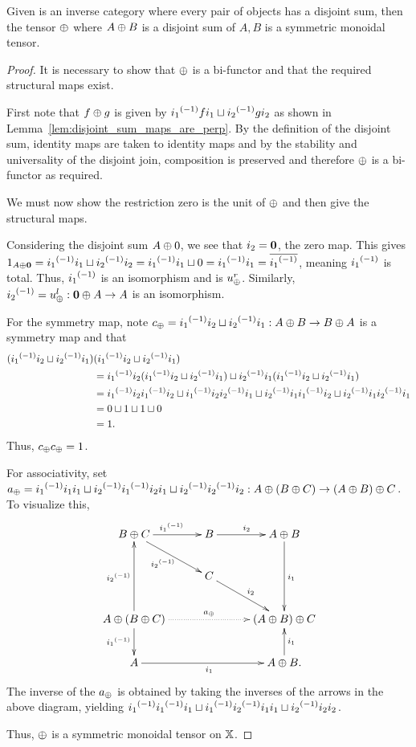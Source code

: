 \begin{proposition}\label{prop:enough_disjoint_sums_make_a_symmetrict_monoidal_tensor}
  Given \X is an inverse category where every pair of objects has a disjoint sum, then the tensor
  $\oplus$ where $A\oplus B$ is a disjoint sum of $A,B$ is a symmetric monoidal tensor.
\end{proposition}
\begin{proof}
  It is necessary to show that $\oplus$ is a bi-functor and that the required structural maps exist.

  First note that $f\oplus g$ is given by ${i_1}^{(-1)} f i_1 \sqcup {i_2}^{(-1)} g i_2$ as shown in
  Lemma~\ref{lem:disjoint_sum_maps_are_perp}. By the definition of the disjoint sum, identity maps
  are taken to identity maps and by the stability and universality of the disjoint join, composition
  is preserved and therefore $\oplus$ is a bi-functor as required.

  We must now show the restriction zero is the unit of $\oplus$ and then give the structural maps.

  Considering the disjoint sum $A\oplus0$, we see that $i_2 = \mathbf{0}$, the zero map. This gives
  $1_{A\oplus\mathbf{0}}  = {i_1}^{(-1)}i_1 \sqcup {i_2}^{(-1)}i_2 = {i_1}^{(-1)}i_1 \sqcup 0 = {i_1}^{(-1)}i_1 =
    \overline{{i_1}^{(-1)}}$, meaning ${i_1}^{(-1)}$ is total. Thus, ${i_1}^{(-1)}$ is an isomorphism and is
  $u_{\oplus}^r$. Similarly, ${i_2}^{(-1)} = u_{\oplus}^l:\mathbf{0}\oplus A \to A$ is an isomorphism.

  For the symmetry map, note $c_\oplus = {i_1}^{(-1)}i_2 \sqcup {i_2}^{(-1)}i_1: A\oplus B \to B\oplus A$ is a symmetry
  map and that
  \begin{align*}
    ({i_1}^{(-1)}i_2 \sqcup {i_2}^{(-1)}i_1)&({i_1}^{(-1)}i_2 \sqcup {i_2}^{(-1)}i_1)\\
    &={i_1}^{(-1)}i_2({i_1}^{(-1)}i_2
    \sqcup {i_2}^{(-1)}i_1) \sqcup {i_2}^{(-1)}i_1({i_1}^{(-1)}i_2 \sqcup {i_2}^{(-1)}i_1)\\
    &={i_1}^{(-1)}i_2{i_1}^{(-1)}i_2 \sqcup {i_1}^{(-1)}i_2{i_2}^{(-1)}i_1 \sqcup {i_2}^{(-1)}i_1{i_1}^{(-1)}i_2
    \sqcup {i_2}^{(-1)}i_1{i_2}^{(-1)}i_1\\
    & = 0 \sqcup 1 \sqcup 1 \sqcup 0 \\
    & = 1.
  \end{align*}
  Thus, $c_\oplus c_\oplus =1$.

  For associativity, set $a_\oplus = {i_1}^{(-1)}i_1i_1 \sqcup {i_2}^{(-1)}{i_1}^{(-1)}i_2i_1 \sqcup {i_2}^{(-1)}
  {i_2}^{(-1)} i_2:A\oplus(B\oplus C) \to (A\oplus B)\oplus C$.
  To visualize this,
  \[
    \xymatrix@C+5pt{
      B\+C \ar[r]^{\inv{i_1}} \ar[dr]_{\inv{i_2}}
        & B \ar[r]^{i_2}
        & A\+B \ar[dd]^{i_1}\\
      & C \ar[dr]^{i_2} & \\
      A\+(B\+C)\ar[uu]^{\inv{i_2}} \ar[d]_{\inv{i_1}} \ar@{.>}[rr]^{a_{\+}} && (A\+B)\+C \\
      A \ar[rr]_{i_1} & & A\+B. \ar[u]_{i_1}
    }
  \]
  The inverse of the $a_\oplus$ is obtained by taking the inverses of the arrows in the above diagram,
  yielding ${i_1}^{(-1)}{i_1}^{(-1)}i_1 \sqcup {i_1}^{(-1)}{i_2}^{(-1)}i_1i_1 \sqcup {i_2}^{(-1)}i_2 i_2$.

  Thus, $\oplus$ is a symmetric monoidal tensor on $\mathbb{X}$.
\end{proof}



